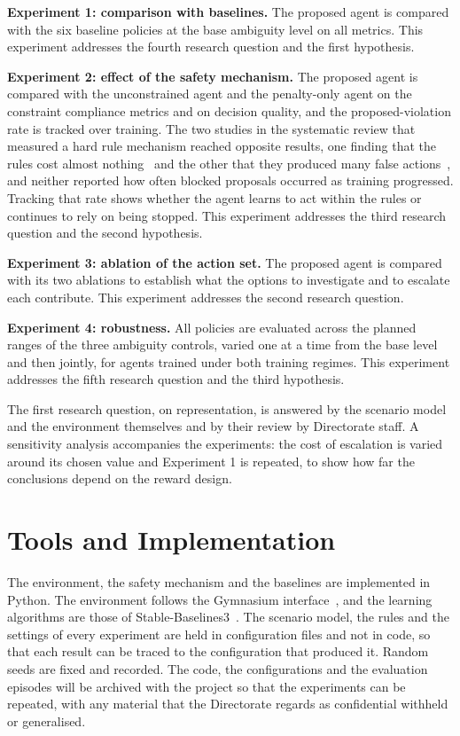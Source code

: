 \textbf{Experiment 1: comparison with baselines.} The proposed agent is compared with the six baseline policies at the base ambiguity level on all metrics. This experiment addresses the fourth research question and the first hypothesis.

\textbf{Experiment 2: effect of the safety mechanism.} The proposed agent is compared with the unconstrained agent and the penalty-only agent on the constraint compliance metrics and on decision quality, and the proposed-violation rate is tracked over training. The two studies in the systematic review that measured a hard rule mechanism reached opposite results, one finding that the rules cost almost nothing~\cite{singh2026} and the other that they produced many false actions~\cite{ravi2025}, and neither reported how often blocked proposals occurred as training progressed. Tracking that rate shows whether the agent learns to act within the rules or continues to rely on being stopped. This experiment addresses the third research question and the second hypothesis.

\textbf{Experiment 3: ablation of the action set.} The proposed agent is compared with its two ablations to establish what the options to investigate and to escalate each contribute. This experiment addresses the second research question.

\textbf{Experiment 4: robustness.} All policies are evaluated across the planned ranges of the three ambiguity controls, varied one at a time from the base level and then jointly, for agents trained under both training regimes. This experiment addresses the fifth research question and the third hypothesis.

The first research question, on representation, is answered by the scenario model and the environment themselves and by their review by Directorate staff. A sensitivity analysis accompanies the experiments: the cost of escalation is varied around its chosen value and Experiment 1 is repeated, to show how far the conclusions depend on the reward design.

\section{Tools and Implementation}
\label{sec:tools}

The environment, the safety mechanism and the baselines are implemented in Python. The environment follows the Gymnasium interface~\cite{towers2024}, and the learning algorithms are those of Stable-Baselines3~\cite{raffin2021}. The scenario model, the rules and the settings of every experiment are held in configuration files and not in code, so that each result can be traced to the configuration that produced it. Random seeds are fixed and recorded. The code, the configurations and the evaluation episodes will be archived with the project so that the experiments can be repeated, with any material that the Directorate regards as confidential withheld or generalised.


